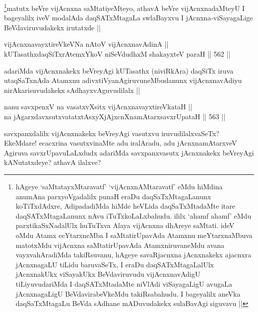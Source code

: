 \begin{artha}
\footnote{hAgeye `saMtatayxMtaravatf' `vijAcnxnAMtaravatf' eMdu hiMdina anumAna parxyoVgadalilx punaH eraDu daqSaTxMtagaLanunx koTiTxdAdxre, AdipadadiMda hiMde heVLida daqSaTxMtadaMte itare daqSATxMtagaLanunx nAvu iTuTxkoLaLxbahudu. ililx `ahamf ahamf' eMdu parxtikaSxNadalUlx huTuTxva Alaya vijAcnxna dhAreye saMtati. ideV oMdu Atamx ceYtarxneMba I saMtatirUpavAda Atamxnu meYtarxnaMbuva matotxMdu vijAcnxna saMtatirUpavAda AtamxniruvaneMdu avana vayxvahAradiMda takiRsuvanu, hAgeye savaRjacnxna jAcnxnakekx ajacnxra jAcnxnagaLU tiLidu baruvaSeTx, I eraDu daqSATxMtagaLalUlx jAcnxnakUkx viSayakUkx BeVdaviruvudu vijAcnxnavAdigU tiLiyuvudariMda I daqSATxMtadaMte niVlAdi viSayagaLigU avugaLa jAcnxnagaLigU BeVdavirabeVkeMdu takiRsabahudu. I bageyalilx aneVka daqSaTxMtagaLu BeVda sAdhane mADuvudakekx sulaBavAgi siguvavu ||}matutx beVre vijAcnxna saMtatiyeMteyo, athavA beVre vijAcnxnadaMteyU I bageyalilx iveV modalAda daqSATxMtagaLa swlaBayxvu I jAcnxna-viSayagaLige BeVdaviruvudakekx irutatxde ||
\end{artha}


\begin{shl}
vijAcnxnavayxtireVkeVNa nAtoV vijAcnxnavAdinA || \\
kUTasathxdaqSiTxrAtemxYkoV niSeVdudhxM shakayxteV paraH ||  562 ||  
\end{shl}

\begin{artha}
adariMda vijAcnxnakekx beVreyAgi kUTasathx (niviRkAra) daqSiTx iruva utaqSaTxnAda Atamxnu adivxtiVyanAgiruvuneMbudanunx vijAcnxnavAdiyu nirAkarisuvudakekx sAdhayxvAguvudilalx ||
\end{artha}


\begin{shl}
nanu savxpenxV na vasatxvXsitx vijAcnxnavayxtireVkataH || \\
na jAgarxdavxsutxvatatxtAsxyXjAjxcnXnamAtarxsavxrUpataH ||  563 ||  
\end{shl}

\begin{artha}
savxpanxdalilx vijAcnxnakekx beVreyAgi vasutxvu iruvudilalxvaSeTx? EkeMdare! ecacxrina vasutxvinaMte adu iralAradu, adu jAcnxnamAtarxveV Agiruva savxrUpavuLaLxdudx adariMda savxpanxvasutx jAcnxnakekx beVreyAgi kANutatxdeye? athavA ilalxve?
\end{artha}

